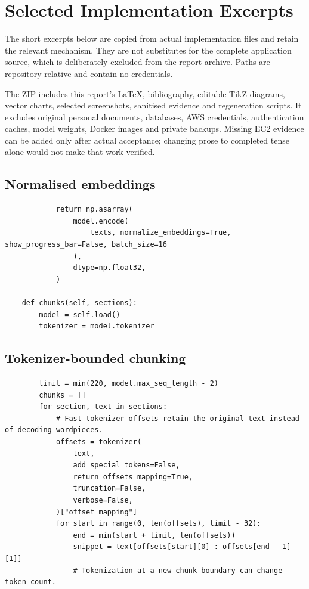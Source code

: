 \chapter{Selected Implementation Excerpts}
\label{app:source}\lstset{basicstyle=\ttfamily\scriptsize}
The short excerpts below are copied from actual implementation files and retain the relevant mechanism. They are not substitutes for the complete application source, which is deliberately excluded from the report archive. Paths are repository-relative and contain no credentials.

The ZIP includes this report's LaTeX, bibliography, editable TikZ diagrams, vector charts, selected screenshots, sanitised evidence and regeneration scripts. It excludes original personal documents, databases, AWS credentials, authentication caches, model weights, Docker images and private backups. Missing EC2 evidence can be added only after actual acceptance; changing prose to completed tense alone would not make that work verified.

\section{Normalised embeddings}
\begin{lstlisting}
            return np.asarray(
                model.encode(
                    texts, normalize_embeddings=True, show_progress_bar=False, batch_size=16
                ),
                dtype=np.float32,
            )

    def chunks(self, sections):
        model = self.load()
        tokenizer = model.tokenizer
\end{lstlisting}

\section{Tokenizer-bounded chunking}
\begin{lstlisting}
        limit = min(220, model.max_seq_length - 2)
        chunks = []
        for section, text in sections:
            # Fast tokenizer offsets retain the original text instead of decoding wordpieces.
            offsets = tokenizer(
                text,
                add_special_tokens=False,
                return_offsets_mapping=True,
                truncation=False,
                verbose=False,
            )["offset_mapping"]
            for start in range(0, len(offsets), limit - 32):
                end = min(start + limit, len(offsets))
                snippet = text[offsets[start][0] : offsets[end - 1][1]]
                # Tokenization at a new chunk boundary can change token count.
\end{lstlisting}

